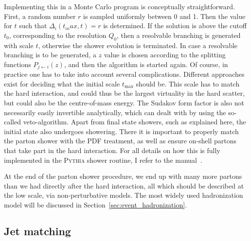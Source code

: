 Implementing this in a Monte Carlo program is conceptually straightforward. 
First, a random number $r$ is sampled uniformly between 0 and 1. Then the value for $t$ such that 
$\Delta_i(t_max,t) = r$ is determined. If the solution is above the cutoff $t_0$, corresponding to
the resolution $Q_0$, then a resolvable branching is generated with scale $t$, otherwise the shower
evolution is terminated. In case a resolvable branching is to be generated, a $z$ value is chosen
according to the splitting functions $P_{j\leftarrow i}(z)$, and then the algorithm is started
again. 
Of course, in practice one has to take into account several complications. 
Different approaches exist for deciding what the initial scale $t_{\text{max}}$ should be.
This scale has to match the hard interaction, and could thus be the largest virtuality in the hard
scatter, but could also be the centre-of-mass energy. 
The Sudakov form factor is also not necessarily easily invertible analytically, which can dealt
with by using the so-called veto-algorithm. 
Apart from final state
showers, such as explained here, the initial state also undergoes showering. There it is important
to properly match the parton shower with the PDF treatment, as well as ensure on-shell partons that
take part in the hard interaction.
For all details on how this is fully implemented in the \textsc{Pythia} shower routine, I refer to
the manual~\cite{Sjostrand:2006za}. 

At the end of the parton shower procedure, we end up with many more partons than we had directly
after the hard interaction, all which should be described at the low scale, via non-perturbative
models. The most widely used hadronization model will be discussed in
Section~\ref{sec:event_hadronization}. 

\subsection{Jet matching}



